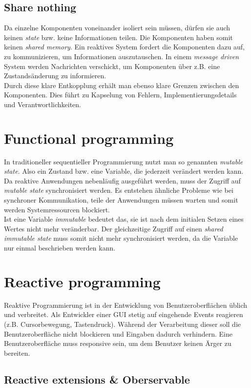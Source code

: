 \subsection{Share nothing}
Da einzelne Komponenten voneinander isoliert sein müssen, dürfen sie auch keinen \textit{state} bzw. keine Informationen teilen. Die Komponenten haben somit keinen \textit{shared memory}. Ein reaktives System fordert die Komponenten dazu auf, zu kommunizieren, um Informationen auszutauschen. In einem \textit{message driven} System werden Nachrichten verschickt, um Komponenten über z.B. eine Zustandsänderung zu informieren.\\
Durch diese klare Entkopplung erhält man ebenso klare Grenzen zwischen den Komponenten. Dies führt zu Kapselung von Fehlern, Implementierungsdetails und Verantwortlichkeiten.


\pagebreak

\section{Functional programming}
In traditioneller sequentieller Programmierung nutzt man so genannten \textit{mutable state}. Also ein Zustand bzw. eine Variable, die jederzeit verändert werden kann. Da reaktive Anwendungen nebenläufig ausgeführt werden, muss der Zugriff auf \textit{mutable state} synchronisiert werden. Es entstehen ähnliche Probleme wie bei synchroner Kommunikation, teile der Anwendungen müssen warten und somit werden Systemressourcen blockiert.\\
Ist eine Variable \textit{immutable} bedeutet das, sie ist nach dem initialen Setzen eines Wertes nicht mehr veränderbar. Der gleichzeitige Zugriff auf einen \textit{shared immutable state} muss somit nicht mehr synchronisiert werden, da die Variable nur einmal beschrieben werden kann.


\section{Reactive programming}
Reaktive Programmierung ist in der Entwicklung von Benutzeroberflächen üblich und verbreitet. Als Entwickler einer GUI stetig auf eingehende Events reagieren (z.B. Cursorbewegung, Tastendruck). Während der Verarbeitung dieser soll die Benutzeroberfläche nicht blockieren und Eingaben dadurch verhindern. Eine Benutzeroberfläche muss responsive sein, um dem Benutzer keinen Ärger zu bereiten.\\


\subsection{Reactive extensions \& Oberservable}
